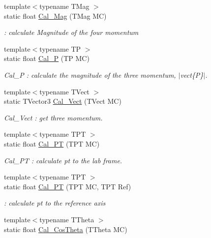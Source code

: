 \begin{DoxyCompactItemize}
{\footnotesize template$<$typename TMag $>$ }\\static float \hyperlink{classToolSet_1_1CMC_acbada53a8416ca460d7aa07453610dc2}{Cal\_\-Mag} (TMag MC)
\begin{DoxyCompactList}\small\item\em : calculate Magnitude of the four momentum \item\end{DoxyCompactList}\item 
{\footnotesize template$<$typename TP $>$ }\\static float \hyperlink{classToolSet_1_1CMC_ae7f67f1180165cedcc4cbeb4e114e5d1}{Cal\_\-P} (TP MC)
\begin{DoxyCompactList}\small\item\em Cal\_\-P : calculate the magnitude of the three momentum, $|$vect\{P\}$|$. \item\end{DoxyCompactList}\item 
{\footnotesize template$<$typename TVect $>$ }\\static TVector3 \hyperlink{classToolSet_1_1CMC_a679d9af4f1004560f178ed10f1a3028c}{Cal\_\-Vect} (TVect MC)
\begin{DoxyCompactList}\small\item\em Cal\_\-Vect : get three momentum. \item\end{DoxyCompactList}\item 
{\footnotesize template$<$typename TPT $>$ }\\static float \hyperlink{classToolSet_1_1CMC_ac479ce63e1328c284ef104449b30d465}{Cal\_\-PT} (TPT MC)
\begin{DoxyCompactList}\small\item\em Cal\_\-PT : calculate pt to the lab frame. \item\end{DoxyCompactList}\item 
{\footnotesize template$<$typename TPT $>$ }\\static float \hyperlink{classToolSet_1_1CMC_a8c4c04395c95a6c513f049029c157a7d}{Cal\_\-PT} (TPT MC, TPT Ref)
\begin{DoxyCompactList}\small\item\em : calculate pt to the reference axis \item\end{DoxyCompactList}\item 
{\footnotesize template$<$typename TTheta $>$ }\\static float \hyperlink{classToolSet_1_1CMC_a7142700aa3c1b586b976e9d71301c7bc}{Cal\_\-CosTheta} (TTheta MC)

\end{DoxyCompactItemize}
